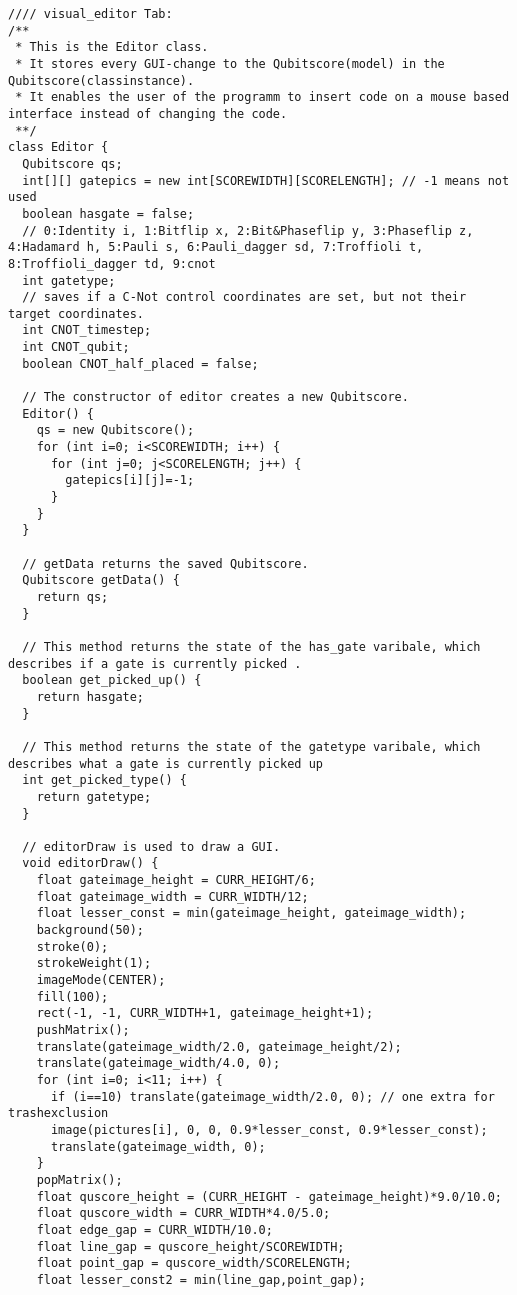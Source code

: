 \documentclass[12pt]{report}
\begin{document}
\begin{lstlisting}
//// visual_editor Tab:
/**
 * This is the Editor class.
 * It stores every GUI-change to the Qubitscore(model) in the Qubitscore(classinstance).
 * It enables the user of the programm to insert code on a mouse based interface instead of changing the code.
 **/
class Editor {
  Qubitscore qs;
  int[][] gatepics = new int[SCOREWIDTH][SCORELENGTH]; // -1 means not used
  boolean hasgate = false;
  // 0:Identity i, 1:Bitflip x, 2:Bit&Phaseflip y, 3:Phaseflip z, 4:Hadamard h, 5:Pauli s, 6:Pauli_dagger sd, 7:Troffioli t, 8:Troffioli_dagger td, 9:cnot
  int gatetype;
  // saves if a C-Not control coordinates are set, but not their target coordinates.
  int CNOT_timestep;
  int CNOT_qubit;
  boolean CNOT_half_placed = false;

  // The constructor of editor creates a new Qubitscore.
  Editor() {
    qs = new Qubitscore();
    for (int i=0; i<SCOREWIDTH; i++) {
      for (int j=0; j<SCORELENGTH; j++) {
        gatepics[i][j]=-1;
      }
    }
  }

  // getData returns the saved Qubitscore.
  Qubitscore getData() {
    return qs;
  }

  // This method returns the state of the has_gate varibale, which describes if a gate is currently picked .
  boolean get_picked_up() {
    return hasgate;
  }

  // This method returns the state of the gatetype varibale, which describes what a gate is currently picked up
  int get_picked_type() {
    return gatetype;
  }

  // editorDraw is used to draw a GUI.
  void editorDraw() {
    float gateimage_height = CURR_HEIGHT/6;
    float gateimage_width = CURR_WIDTH/12;
    float lesser_const = min(gateimage_height, gateimage_width);
    background(50);
    stroke(0); 
    strokeWeight(1);
    imageMode(CENTER);
    fill(100); 
    rect(-1, -1, CURR_WIDTH+1, gateimage_height+1);
    pushMatrix();
    translate(gateimage_width/2.0, gateimage_height/2);
    translate(gateimage_width/4.0, 0);
    for (int i=0; i<11; i++) {
      if (i==10) translate(gateimage_width/2.0, 0); // one extra for trashexclusion
      image(pictures[i], 0, 0, 0.9*lesser_const, 0.9*lesser_const);
      translate(gateimage_width, 0);
    }
    popMatrix();
    float quscore_height = (CURR_HEIGHT - gateimage_height)*9.0/10.0;
    float quscore_width = CURR_WIDTH*4.0/5.0;
    float edge_gap = CURR_WIDTH/10.0;
    float line_gap = quscore_height/SCOREWIDTH;
    float point_gap = quscore_width/SCORELENGTH;
    float lesser_const2 = min(line_gap,point_gap);


\end{lstlisting}
\end{document}
